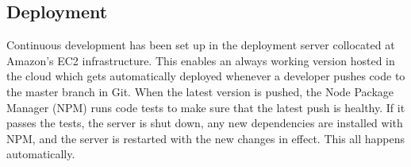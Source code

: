 \subsection{Deployment}

Continuous development has been set up in the deployment server collocated at
Amazon's EC2 infrastructure. This enables an always working version hosted in
the cloud which gets automatically deployed whenever a developer pushes code to
the master branch in Git. When the latest version is pushed, the Node Package
Manager (NPM) runs code tests to make sure that the latest push is healthy. If
it passes the tests, the server is shut down, any new dependencies are installed
with NPM, and the server is restarted with the new changes in effect. This all
happens automatically.
